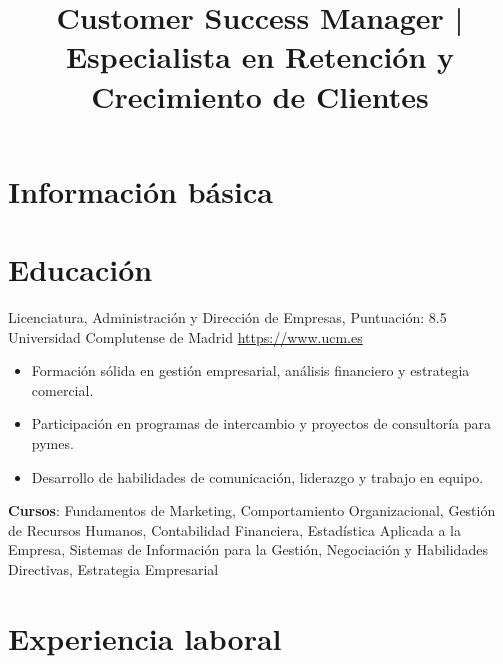 \documentclass[a4paper, serif, 10pt]{moderncv}
\title{Customer Success Manager | Especialista en Retención y Crecimiento de Clientes}
\begin{document}
\maketitle

\section{Información básica}

\section{Educación}

        {Licenciatura, Administración y Dirección de Empresas, Puntuación: 8.5}
        {Universidad Complutense de Madrid}
        {\url{https://www.ucm.es}}
        {}
        {\begin{itemize}
\item Formación sólida en gestión empresarial, análisis financiero y estrategia comercial.
\item Participación en programas de intercambio y proyectos de consultoría para pymes.
\item Desarrollo de habilidades de comunicación, liderazgo y trabajo en equipo.
\end{itemize}
\textbf{Cursos}: Fundamentos de Marketing, Comportamiento Organizacional, Gestión de Recursos Humanos, Contabilidad Financiera, Estadística Aplicada a la Empresa, Sistemas de Información para la Gestión, Negociación y Habilidades Directivas, Estrategia Empresarial}
\section{Experiencia laboral}
\end{document}
